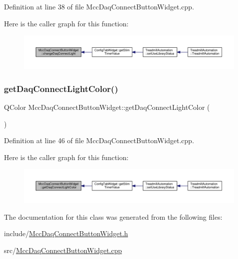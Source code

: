 Definition at line 38 of file Mcc\+Daq\+Connect\+Button\+Widget.\+cpp.

Here is the caller graph for this function\+:
\nopagebreak
\begin{figure}[H]
\begin{center}
\leavevmode
\includegraphics[width=350pt]{class_mcc_daq_connect_button_widget_a13cf53dd69d563035e8ce30fec54a003_icgraph}
\end{center}
\end{figure}
\mbox{\label{class_mcc_daq_connect_button_widget_a4d63807d04d7c3d09e6316394bc55833}} 
\subsubsection{\texorpdfstring{get\+Daq\+Connect\+Light\+Color()}{getDaqConnectLightColor()}}
{\footnotesize\ttfamily Q\+Color Mcc\+Daq\+Connect\+Button\+Widget\+::get\+Daq\+Connect\+Light\+Color (\begin{DoxyParamCaption}{ }\end{DoxyParamCaption})}



Definition at line 46 of file Mcc\+Daq\+Connect\+Button\+Widget.\+cpp.

Here is the caller graph for this function\+:
\nopagebreak
\begin{figure}[H]
\begin{center}
\leavevmode
\includegraphics[width=350pt]{class_mcc_daq_connect_button_widget_a4d63807d04d7c3d09e6316394bc55833_icgraph}
\end{center}
\end{figure}


The documentation for this class was generated from the following files\+:\begin{DoxyCompactItemize}
\item 
include/\hyperlink{_mcc_daq_connect_button_widget_8h}{Mcc\+Daq\+Connect\+Button\+Widget.\+h}\item 
src/\hyperlink{_mcc_daq_connect_button_widget_8cpp}{Mcc\+Daq\+Connect\+Button\+Widget.\+cpp}\end{DoxyCompactItemize}
